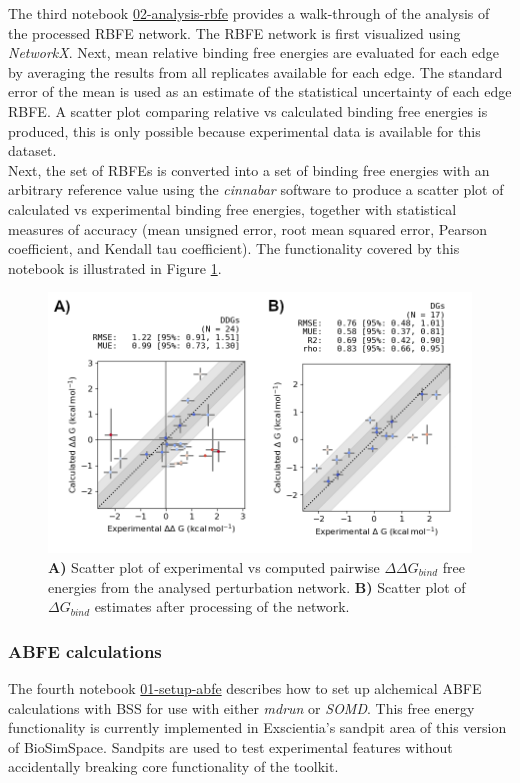 The third notebook \href{https://github.com/OpenBioSim/biosimspace_tutorials/blob/main/04_fep/02_RBFE/02_analysis_rbfe.ipynb}{02-analysis-rbfe} provides a walk-through of the analysis of the processed RBFE network. 
The RBFE network is first visualized using \emph{NetworkX}. Next, mean relative binding free energies are evaluated for each edge by averaging the results from all replicates available for each edge. The standard error of the mean is used as an estimate of the statistical uncertainty of each edge RBFE. A scatter plot comparing relative vs calculated binding free energies is produced, this is only possible because experimental data is available for this dataset. 
\\
Next, the set of RBFEs is converted into a set of binding free energies with an arbitrary reference value using the \emph{cinnabar} software to produce a scatter plot of calculated vs experimental binding free energies, together with statistical measures of accuracy (mean unsigned error, root mean squared error, Pearson coefficient, and Kendall tau coefficient). The functionality covered by this notebook is illustrated in Figure \ref{rbfe_analysis_fig}.
\\

\begin{figure}[htp]
\includegraphics[width=\linewidth]{LIVECOMS/04_fep/rbfe-analysis.png}
\caption{ \textbf{A)} Scatter plot of experimental vs computed pairwise $\Delta \Delta G_{bind}$ free energies from the analysed perturbation network. \textbf{B)} Scatter plot of $\Delta G_{bind}$ estimates after processing of the network. } 
\label{rbfe_analysis_fig}
\end{figure}

\subsubsection{ABFE calculations}
%
The fourth notebook \href{https://github.com/OpenBioSim/biosimspace_tutorials/blob/main/04_fep/03_ABFE/01_setup_abfe.ipynb}{01-setup-abfe} describes how to set up alchemical ABFE calculations with BSS for use with either \emph{mdrun} or \emph{SOMD}. This free energy functionality is currently implemented in Exscientia's sandpit area of this version of BioSimSpace. Sandpits are used to test experimental features without accidentally breaking core functionality of the toolkit. 

